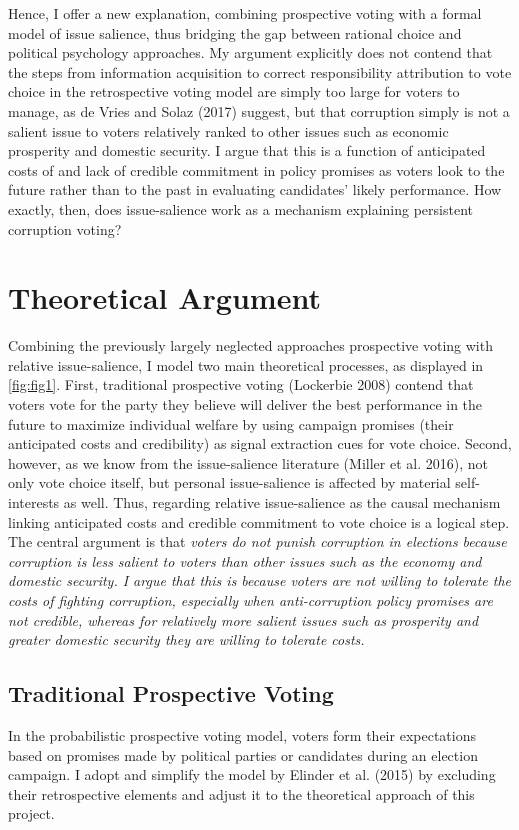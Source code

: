 \documentclass[11pt]{article}
\begin{document}
Hence, I offer a new explanation, combining prospective voting with a formal model of issue salience, thus bridging the gap between rational choice and political psychology approaches. My argument explicitly does not contend that the steps from information acquisition to correct responsibility attribution to vote choice in the retrospective voting model are simply too large for voters to manage, as de Vries and Solaz (2017) suggest, but that corruption simply is not a salient issue to voters relatively ranked to other issues such as economic prosperity and domestic security. I argue that this is a function of anticipated costs of and lack of credible commitment in policy promises as voters look to the future rather than to the past in evaluating candidates' likely performance. How exactly, then, does issue-salience work as a mechanism explaining persistent corruption voting?


\newpage
\section{Theoretical Argument}
Combining the previously largely neglected approaches prospective voting with relative issue-salience, I model two main theoretical processes, as displayed in \autoref{fig:fig1}. First, traditional prospective voting (Lockerbie 2008) contend that voters vote for the party they believe will deliver the best performance in the future to maximize individual welfare by using campaign promises (their anticipated costs and credibility) as signal extraction cues for vote choice. Second, however, as we know from the issue-salience literature (Miller et al. 2016), not only vote choice itself, but personal issue-salience is affected by material self-interests as well. Thus, regarding relative issue-salience as the causal mechanism linking anticipated costs and credible commitment to vote choice is a logical step. The central argument is that \textit{voters do not punish corruption in elections because corruption is less salient to voters than other issues such as the economy and domestic security. I argue that this is because voters are not willing to tolerate the costs of fighting corruption, especially when anti-corruption policy promises are not credible, whereas for relatively more salient issues such as prosperity and greater domestic security they are willing to tolerate costs.}

\subsection{Traditional Prospective Voting}
In the probabilistic prospective voting model, voters form their expectations based on promises made by political parties or candidates during an election campaign. I adopt and simplify the model by Elinder et al. (2015) by excluding their retrospective elements and adjust it to the theoretical approach of this project.
\end{document}

